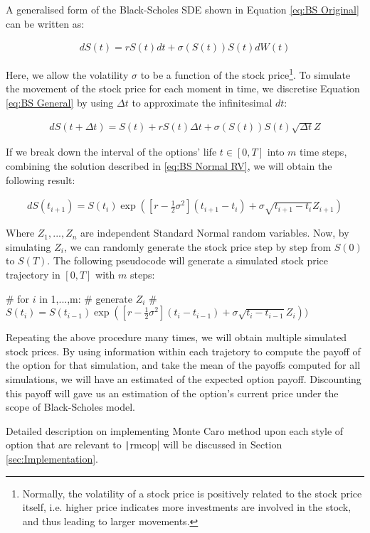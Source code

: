A generalised form of the Black-Scholes SDE shown in Equation \ref{eq:BS Original} can be written as:

\begin{align} \label{eq:BS General}
dS(t) = rS(t)dt + \sigma(S(t))S(t)dW(t)
\end{align}

Here, we allow the volatility $\sigma$ to be a function of the stock price\footnote{Normally, the volatility of a stock price is positively related to the stock price itself, i.e. higher price indicates more investments are involved in the stock, and thus leading to larger movements.}. To simulate the movement of the stock price for each moment in time, we discretise Equation \ref{eq:BS General} by using $\Delta t$ to approximate the infinitesimal $dt$:

\begin{align}
dS(t + \Delta t) = S(t) + rS(t)\Delta t + \sigma(S(t))S(t)\sqrt{\Delta t}Z
\end{align}

If we break down the interval of the options' life $t\in[0,T]$ into $m$ time steps, combining the solution described in \ref{eq:BS Normal RV}, we will obtain the following result:

\begin{align} \label{eq:BS for MC}
dS(t_{i+1}) = S(t_i)\exp{([r - \frac{1}{2}\sigma^2](t_{i+1}-t_i) + \sigma\sqrt{t_{i+1} - t_i}Z_{i+1})}
\end{align}

Where $Z_1,...,Z_n$ are independent Standard Normal random variables. Now, by simulating $Z_i$, we can randomly generate the stock price step by step from $S(0)$ to $S(T)$. The following pseudocode will generate a simulated stock price trajectory in $[0,T]$ with $m$ steps:

\begin{Rminted}
# for $i$ in 1,...,m:
#	generate $Z_{i}$
#	$S(t_i) = S(t_{i-1})\exp{([r - \frac{1}{2}\sigma^2](t_{i}-t_{i-1}) + \sigma\sqrt{t_{i}-t_{i-1}}Z_{i}))}$
\end{Rminted}

Repeating the above procedure many times, we will obtain multiple simulated stock prices. By using information within each trajetory to compute the payoff of the option for that simulation, and take the mean of the payoffs computed for all simulations, we will have an estimated of the expected option payoff. Discounting this payoff will gave us an estimation of the option's current price under the scope of Black-Scholes model.

Detailed description on implementing Monte Caro method upon each style of option that are relevant to \texttt|rmcop| will be discussed in Section \ref{sec:Implementation}.

\newpage